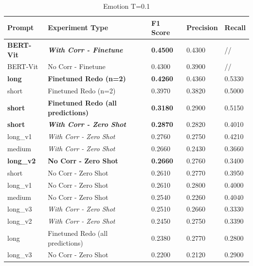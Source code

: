 \documentclass[letterpaper,journal]{IEEEtran}
\begin{document}
\begin{table}[!t]
\centering
\caption{Emotion T=0.1}
\label{tab:pixtral_emotions_01}
\begin{tabular}{l|l|l|l|l}
\textbf{Prompt}   & \textbf{Experiment Type}                  & \textbf{F1 Score} & \textbf{Precision} & \textbf{Recall}  \\ 
\hline
\textbf{BERT-Vit} & \textit{\textbf{With Corr - Finetune}}    & \textbf{0.4500}   & 0.4300             & //               \\
BERT-Vit          & No Corr - Finetune                        & 0.4300            & 0.3900             & //               \\
\textbf{long}     & \textbf{Finetuned Redo (n=2)}             & \textbf{0.4260}   & 0.4360             & 0.5330           \\
short             & Finetuned Redo (n=2)                      & 0.3970            & 0.3820             & 0.5000           \\
\textbf{short}    & \textbf{Finetuned Redo (all predictions)} & \textbf{0.3180}   & 0.2900             & 0.5150           \\
\textbf{short}    & \textit{\textbf{With Corr - Zero Shot}}   & \textbf{0.2870}   & 0.2820             & 0.4010           \\
long\_v1          & \textit{With Corr - Zero Shot}            & 0.2760            & 0.2750             & 0.4210           \\
medium            & \textit{With Corr - Zero Shot}            & 0.2660            & 0.2430             & 0.3660           \\
\textbf{long\_v2} & \textbf{No Corr - Zero Shot}              & \textbf{0.2660}   & 0.2760             & 0.3400           \\
short             & No Corr - Zero Shot                       & 0.2610            & 0.2770             & 0.3950           \\
long\_v1          & No Corr - Zero Shot                       & 0.2610            & 0.2800             & 0.4000           \\
medium            & No Corr - Zero Shot                       & 0.2540            & 0.2260             & 0.4040           \\
long\_v3          & \textit{With Corr - Zero Shot}            & 0.2510            & 0.2660             & 0.3330           \\
long\_v2          & \textit{With Corr - Zero Shot}            & 0.2450            & 0.2750             & 0.3390           \\
long              & Finetuned Redo (all
  predictions)        & 0.2380            & 0.2770             & 0.2800           \\
long\_v3          & No Corr - Zero Shot                       & 0.2200            & 0.2120             & 0.2900          
\end{tabular}
\end{table}
\end{document}
